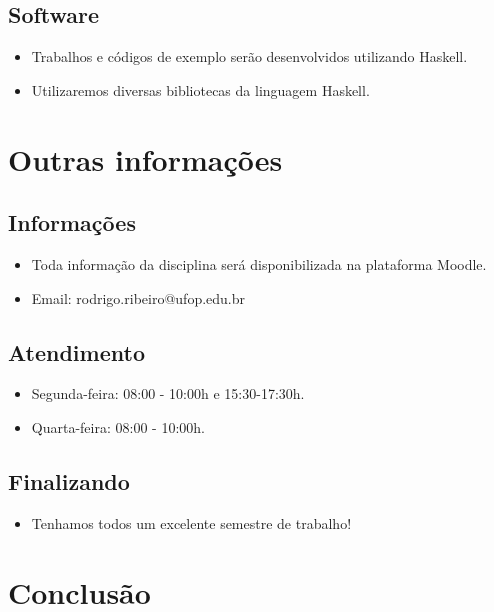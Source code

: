 \documentclass[11pt]{article}
\begin{document}
\subsection*{Software}
\label{sec:orgc937e84}

\begin{itemize}
\item Trabalhos e códigos de exemplo serão desenvolvidos utilizando Haskell.

\item Utilizaremos diversas bibliotecas da linguagem Haskell.
\end{itemize}
\section*{Outras informações}
\label{sec:org673e3da}

\subsection*{Informações}
\label{sec:org46dbcd6}

\begin{itemize}
\item Toda informação da disciplina será disponibilizada na plataforma
Moodle.

\item Email: rodrigo.ribeiro@ufop.edu.br
\end{itemize}
\subsection*{Atendimento}
\label{sec:org084d866}

\begin{itemize}
\item Segunda-feira: 08:00 - 10:00h e 15:30-17:30h.
\item Quarta-feira: 08:00 - 10:00h.
\end{itemize}
\subsection*{Finalizando}
\label{sec:org667d57a}

\begin{itemize}
\item Tenhamos todos um excelente semestre de trabalho!
\end{itemize}
\section*{Conclusão}
\label{sec:org4dfb57d}
\end{document}
